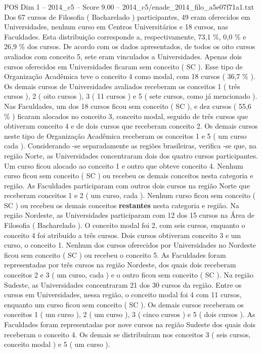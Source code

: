 \begin{textsample}{POS Dim 1 – 2014\_c5 – Score 9.00 – 2014\_c5/enade\_2014\_filo\_a5e07f71a1.txt}
Dos 67 cursos de Filosofia ( Bacharelado ) participantes, 49 eram oferecidos em Universidades, nenhum curso em Centros Universitários e 18 cursos, nas Faculdades.
Esta distribuição corresponde a, respectivamente, 73,1 \%, 0,0 \% e 26,9 \% dos cursos.
De acordo com os dados apresentados, de todos os oito cursos avaliados com conceito 5, sete eram vinculados a Universidades.
Apenas dois cursos oferecidos em Universidades ficaram sem conceito ( SC ).
Esse tipo de Organização Acadêmica teve o conceito 4 como modal, com 18 cursos ( 36,7 \% ).
Os demais cursos de Universidades avaliados receberam os conceitos 1 ( três cursos ), 2 ( oito cursos ), 3 ( 11 cursos ) e 5 ( sete cursos, como já mencionado ).
Nas Faculdades, um dos 18 cursos ficou sem conceito ( SC ), e dez cursos ( 55,6 \% ) ficaram alocados no conceito 3, conceito modal, seguido de três cursos que obtiveram conceito 4 e de dois cursos que receberam conceito 2.
Os demais cursos neste tipo de Organização Acadêmica receberam os conceitos 1 e 5 ( um curso cada ).
Considerando -se separadamente as regiões brasileiras, verifica -se que, na região Norte, as Universidades concentraram dois dos quatro cursos participantes.
Um curso ficou alocado ao conceito 1 e outro que obteve conceito 4.
Nenhum curso ficou sem conceito ( SC ) ou recebeu os demais conceitos nesta categoria e região.
As Faculdades participaram com outros dois cursos na região Norte que receberam conceitos 1 e 2 ( um curso, cada ).
Nenhum curso ficou sem conceito ( SC ) ou recebeu os demais conceitos \textbf{restantes} nesta categoria e região.
Na região Nordeste, as Universidades participaram com 12 dos 15 cursos na Área de Filosofia ( Bacharelado ).
O conceito modal foi 2, com seis cursos, enquanto o conceito 4 foi atribuído a três cursos.
Dois cursos obtiveram conceito 3 e um curso, o conceito 1.
Nenhum dos cursos oferecidos por Universidades no Nordeste ficou sem conceito ( SC ) ou recebeu o conceito 5.
As Faculdades foram representadas por três cursos na região Nordeste, dos quais dois receberam conceitos 2 e 3 ( um curso, cada ) e o outro ficou sem conceito ( SC ).
Na região Sudeste, as Universidades concentraram 21 dos 30 cursos da região.
Entre os cursos em Universidades, nessa região, o conceito modal foi 4 com 11 cursos, enquanto um curso ficou sem conceito ( SC ).
Os demais cursos receberam os conceitos 1 ( um curso ), 2 ( um curso ), 3 ( cinco cursos ) e 5 ( dois cursos ).
As Faculdades foram representadas por nove cursos na região Sudeste dos quais dois receberam o conceito 4.
Os demais se distribuíram nos conceitos 3 ( seis cursos, conceito modal ) e 5 ( um curso ).

\end{textsample}
